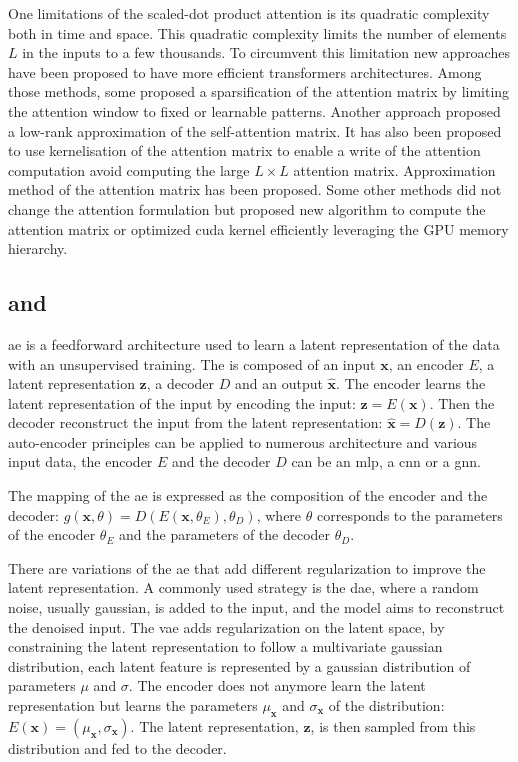 \documentclass[../main.tex]{subfiles}
\begin{document}
	 One limitations of the scaled-dot product attention is its quadratic complexity both in time and space.
	 This quadratic complexity limits the number of elements \(L\) in the inputs to a few thousands.
	 To circumvent this limitation new approaches have been proposed to have more efficient transformers architectures.
	 Among those methods, some proposed a sparsification of the attention matrix by limiting the attention window to fixed or learnable patterns.
	 Another approach proposed a low-rank approximation of the self-attention matrix.
	 It has also been proposed to use kernelisation of the attention matrix to enable a write of the attention computation avoid computing the large \(L \times L\) attention matrix.
	 Approximation method of the attention matrix has been proposed.
	 Some other methods did not change the attention formulation but proposed new algorithm to compute the attention matrix or optimized cuda kernel efficiently leveraging the GPU memory hierarchy.

 \subsection{ and }
	 \Gls{ae} is a feedforward architecture used to learn a latent representation of the data with an unsupervised training.
	 The  is composed of an input \(\symbf{x}\), an encoder \(E\), a latent representation \(\symbf{z}\), a decoder \(D\) and an output \(\symbf{\hat{x}}\).
	 The encoder learns the latent representation of the input by encoding the input: \(\symbf{z} = E\left(\symbf{x}\right)\).
	 Then the decoder reconstruct the input from the latent representation: \(\symbf{\hat{x}} = D\left(\symbf{z}\right)\).
	 The auto-encoder principles can be applied to numerous architecture and various input data, the encoder \(E\) and the decoder \(D\) can be an \gls{mlp}, a \gls{cnn} or a \gls{gnn}.

	 The mapping of the \gls{ae} is expressed as the composition of the encoder and the decoder: \(g\left(\symbf{x}, \theta\right) = D\left(E\left(\symbf{x}, \theta_E\right), \theta_D\right)\), where \(\theta\) corresponds to the parameters of the encoder \(\theta_E\) and the parameters of the decoder \(\theta_D\).

	 There are variations of the \gls{ae} that add different regularization to improve the latent representation.
	 A commonly used strategy is the \gls{dae}, where a random noise, usually gaussian, is added to the input, and the model aims to reconstruct the denoised input.
	 The \gls{vae} adds regularization on the latent space, by constraining the latent representation to follow a multivariate gaussian distribution, each latent feature is represented by a gaussian distribution of parameters \(\mu\) and \(\sigma\).
	 The encoder does not anymore learn the latent representation but learns the parameters \(\mu_{\symbf{x}}\) and \(\sigma_{\symbf{x}}\) of the distribution: \(E\left(\symbf{x}\right) = \left(\mu_{\symbf{x}},\sigma_{\symbf{x}}\right) \).
	 The latent representation, \(\symbf{z}\), is then sampled from this distribution and fed to the decoder.
\end{document}
